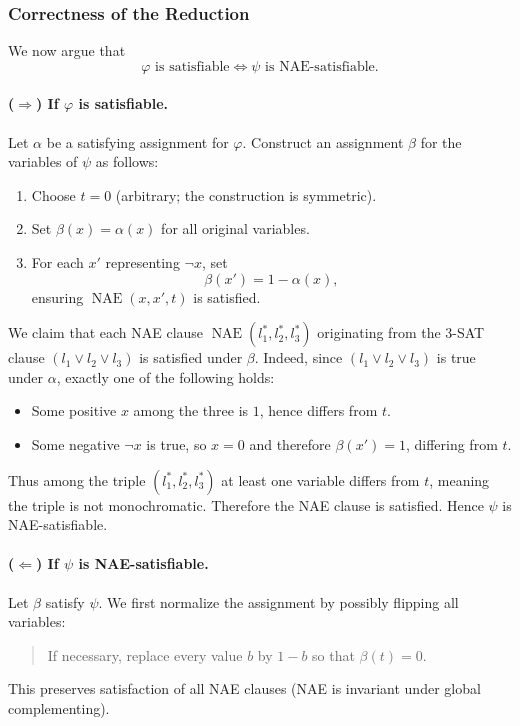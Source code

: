 \documentclass[9pt]{extarticle}
\begin{document}
\subsubsection*{Correctness of the Reduction}

We now argue that
\[
\varphi \text{ is satisfiable} \iff \psi \text{ is NAE-satisfiable}.
\]

\paragraph{($\Rightarrow$) If $\varphi$ is satisfiable.}

Let $\alpha$ be a satisfying assignment for $\varphi$.  Construct an assignment
$\beta$ for the variables of $\psi$ as follows:
\begin{enumerate}
    \item Choose $t = 0$ (arbitrary; the construction is symmetric).
    \item Set $\beta(x) = \alpha(x)$ for all original variables.
    \item For each $x'$ representing $\neg x$, set
    \[
        \beta(x') = 1 - \alpha(x),
    \]
    ensuring $\operatorname{NAE}(x,x',t)$ is satisfied.
\end{enumerate}

We claim that each NAE clause $\operatorname{NAE}(l_1^*,l_2^*,l_3^*)$
originating from the 3-SAT clause $(l_1 \lor l_2 \lor l_3)$ is satisfied under
$\beta$.  Indeed, since $(l_1 \lor l_2 \lor l_3)$ is true under $\alpha$,
exactly one of the following holds:
\begin{itemize}
    \item Some positive $x$ among the three is $1$, hence differs from $t$.
    \item Some negative $\neg x$ is true, so $x = 0$ and therefore $\beta(x') =
    1$, differing from $t$.
\end{itemize}
Thus among the triple $(l_1^*, l_2^*, l_3^*)$ at least one variable differs
from $t$, meaning the triple is not monochromatic.  Therefore the NAE clause is
satisfied.  Hence $\psi$ is NAE-satisfiable.

\paragraph{($\Leftarrow$) If $\psi$ is NAE-satisfiable.}

Let $\beta$ satisfy $\psi$.  We first normalize the assignment by possibly
flipping all variables:
\begin{quote}
    If necessary, replace every value $b$ by $1-b$ so that $\beta(t)=0$.
\end{quote}
This preserves satisfaction of all NAE clauses (NAE is invariant under global
complementing).
\end{document}
